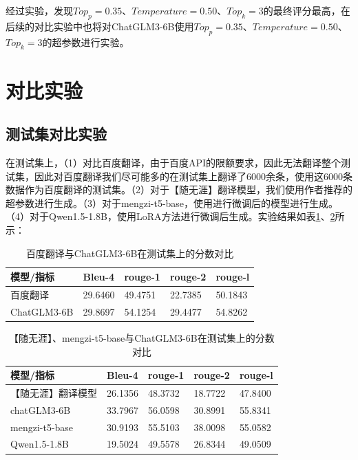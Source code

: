 \documentclass[
    decl-page,  %
    ,fontset = win, %
  ]{njuthesis}
\begin{document}
经过实验，发现$Top_p=0.35$、$Temperature=0.50$、$Top_k=3$的最终评分最高，在后续的对比实验中也将对ChatGLM3-6B使用$Top_p=0.35$、$Temperature=0.50$、$Top_k=3$的超参数进行实验。

\section{对比实验}

\subsection{测试集对比实验}
在测试集上，（1）对比百度翻译，由于百度API的限额要求，因此无法翻译整个测试集，因此对百度翻译我们尽可能多的在测试集上翻译了6000余条，使用这6000条数据作为百度翻译的测试集。（2）对于【随无涯】翻译模型，我们使用作者推荐的超参数进行生成。（3）对于mengzi-t5-base，使用进行微调后的模型进行生成。（4）对于Qwen1.5-1.8B，使用LoRA方法进行微调后生成。实验结果如表\ref{baidu-caht}、\ref{mengzi-wyw-caht}所示：

\begin{table}[h]
\renewcommand\arraystretch{1.5}
\caption{百度翻译与ChatGLM3-6B在测试集上的分数对比}
\label{baidu-caht}
\begin{tabular}{|l|l|l|l|l|}
\hline
\textbf{模型/指标} & \textbf{Bleu-4} & \textbf{rouge-1} & \textbf{rouge-2} & \textbf{rouge-l} \\ \hline
百度翻译           & 29.6460         & 49.4751          & 22.7385          & 50.1843          \\ \hline
ChatGLM3-6B    & 29.8697         & 54.1254          & 29.4477          & 54.8262          \\ \hline
\end{tabular}
\end{table}

\begin{table}[h]
\renewcommand\arraystretch{1.5}
\caption{【随无涯】、mengzi-t5-base与ChatGLM3-6B在测试集上的分数对比}
\label{mengzi-wyw-caht}
\begin{tabular}{|l|l|l|l|l|}
\hline
\textbf{模型/指标} & \textbf{Bleu-4} & \textbf{rouge-1} & \textbf{rouge-2} & \textbf{rouge-l} \\ \hline
【随无涯】翻译模型      & 26.1356         & 48.3732          & 18.7722          & 47.8400          \\ \hline
chatGLM3-6B    & 33.7967         & 56.0598          & 30.8991          & 55.8341          \\ \hline
mengzi-t5-base & 30.9193         & 55.5103          & 38.0098          & 55.0582          \\ \hline
Qwen1.5-1.8B & 19.5024         & 49.5578          & 26.8344          & 49.0509          \\ \hline
\end{tabular}
\end{table}
\end{document}
